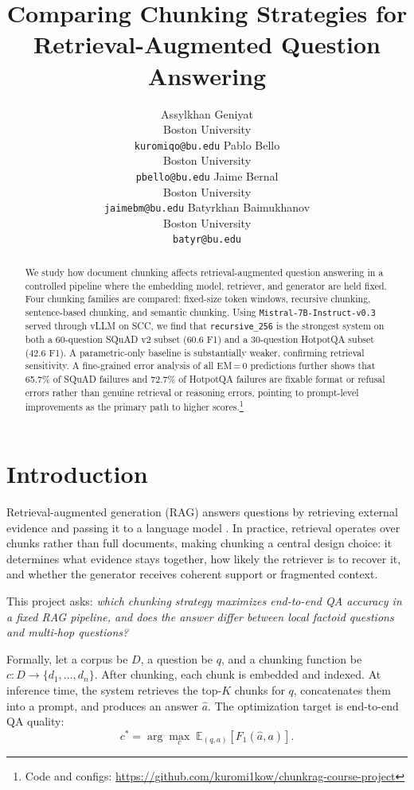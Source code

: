 \documentclass[11pt]{article}
\title{Comparing Chunking Strategies for Retrieval-Augmented Question Answering}
\author{
  Assylkhan Geniyat \\
  Boston University \\
  \texttt{kuromiqo@bu.edu} \And
  Pablo Bello \\
  Boston University \\
  \texttt{pbello@bu.edu} \And
  Jaime Bernal \\
  Boston University \\
  \texttt{jaimebm@bu.edu} \AND
  Batyrkhan Baimukhanov \\
  Boston University \\
  \texttt{batyr@bu.edu}
}
\date{}
\begin{document}
\maketitle

\begin{abstract}
We study how document chunking affects retrieval-augmented question answering in a
controlled pipeline where the embedding model, retriever, and generator are held fixed.
Four chunking families are compared: fixed-size token windows, recursive chunking,
sentence-based chunking, and semantic chunking. Using \texttt{Mistral-7B-Instruct-v0.3}
served through vLLM on SCC, we find that \texttt{recursive\_256} is the strongest system
on both a 60-question SQuAD v2 subset (60.6 F1) and a 30-question HotpotQA subset
(42.6 F1). A parametric-only baseline is substantially weaker, confirming retrieval
sensitivity. A fine-grained error analysis of all EM\,=\,0 predictions further shows
that 65.7\% of SQuAD failures and 72.7\% of HotpotQA failures are fixable format or
refusal errors rather than genuine retrieval or reasoning errors, pointing to prompt-level
improvements as the primary path to higher scores.\footnote{Code and configs:
\url{https://github.com/kuromi1kow/chunkrag-course-project}}
\end{abstract}

\section{Introduction}

Retrieval-augmented generation (RAG) answers questions by retrieving external evidence
and passing it to a language model \citep{lewis2020rag}. In practice, retrieval
operates over chunks rather than full documents, making chunking a central design
choice: it determines what evidence stays together, how likely the retriever is to
recover it, and whether the generator receives coherent support or fragmented context.

This project asks: \textit{which chunking strategy maximizes end-to-end QA accuracy in
a fixed RAG pipeline, and does the answer differ between local factoid questions and
multi-hop questions?}

Formally, let a corpus be $D$, a question be $q$, and a chunking function be
$c : D \rightarrow \{d_1, \dots, d_n\}$. After chunking, each chunk is embedded and
indexed. At inference time, the system retrieves the top-$K$ chunks for $q$,
concatenates them into a prompt, and produces an answer $\hat{a}$. The optimization
target is end-to-end QA quality:
\[
c^* = \arg\max_c \; \mathbb{E}_{(q,a)} \left[ F_1(\hat{a}, a) \right].
\]
\end{document}
